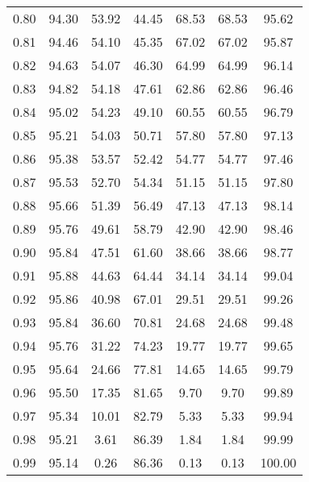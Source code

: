 \begin{tabular}{|c|c|c|c|c|c|c|}
      0.80 &     94.30 &     53.92 &      44.45 &   68.53 &      68.53 &         95.62 \\
      0.81 &     94.46 &     54.10 &      45.35 &   67.02 &      67.02 &         95.87 \\
      0.82 &     94.63 &     54.07 &      46.30 &   64.99 &      64.99 &         96.14 \\
      0.83 &     94.82 &     54.18 &      47.61 &   62.86 &      62.86 &         96.46 \\
      0.84 &     95.02 &     54.23 &      49.10 &   60.55 &      60.55 &         96.79 \\
      0.85 &     95.21 &     54.03 &      50.71 &   57.80 &      57.80 &         97.13 \\
      0.86 &     95.38 &     53.57 &      52.42 &   54.77 &      54.77 &         97.46 \\
      0.87 &     95.53 &     52.70 &      54.34 &   51.15 &      51.15 &         97.80 \\
      0.88 &     95.66 &     51.39 &      56.49 &   47.13 &      47.13 &         98.14 \\
      0.89 &     95.76 &     49.61 &      58.79 &   42.90 &      42.90 &         98.46 \\
      0.90 &     95.84 &     47.51 &      61.60 &   38.66 &      38.66 &         98.77 \\
      0.91 &     95.88 &     44.63 &      64.44 &   34.14 &      34.14 &         99.04 \\
      0.92 &     95.86 &     40.98 &      67.01 &   29.51 &      29.51 &         99.26 \\
      0.93 &     95.84 &     36.60 &      70.81 &   24.68 &      24.68 &         99.48 \\
      0.94 &     95.76 &     31.22 &      74.23 &   19.77 &      19.77 &         99.65 \\
      0.95 &     95.64 &     24.66 &      77.81 &   14.65 &      14.65 &         99.79 \\
      0.96 &     95.50 &     17.35 &      81.65 &    9.70 &       9.70 &         99.89 \\
      0.97 &     95.34 &     10.01 &      82.79 &    5.33 &       5.33 &         99.94 \\
      0.98 &     95.21 &      3.61 &      86.39 &    1.84 &       1.84 &         99.99 \\
      0.99 &     95.14 &      0.26 &      86.36 &    0.13 &       0.13 &        100.00 \\
\bottomrule
\end{tabular}
